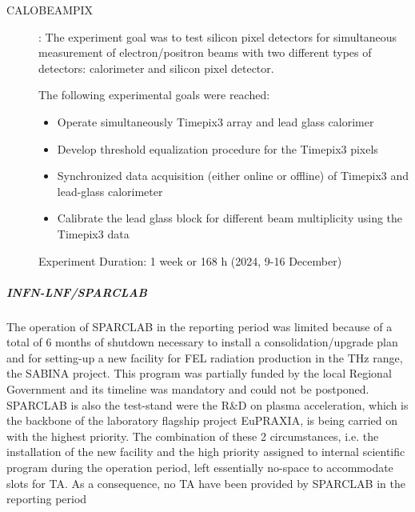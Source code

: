 \begin{description}
\item[CALOBEAMPIX]:
The experiment goal was to test silicon pixel detectors for simultaneous measurement of electron/positron beams with two different types of detectors: calorimeter and silicon pixel detector. 

The following experimental goals were reached:
\begin{itemize}
    \item Operate simultaneously Timepix3 array and lead glass calorimer
    \item Develop threshold equalization procedure for the Timepix3 pixels
    \item Synchronized data acquisition (either online or offline) of Timepix3 and lead-glass calorimeter
    \item Calibrate the lead glass block for different beam multiplicity using the Timepix3 data
\end{itemize}
Experiment Duration: 1 week or 168 h (2024, 9-16 December)
\end{description}

\subparagraph{INFN-LNF/SPARCLAB}

The operation of SPARCLAB in the reporting period was limited because of a total of 6 months of shutdown necessary to install a consolidation/upgrade plan and for setting-up a new facility for FEL radiation production in the THz range, the SABINA project. This program was partially funded by the local Regional Government and its timeline was mandatory and could not be postponed. SPARCLAB is also the test-stand were the R\&D on plasma acceleration, which is the backbone of the laboratory flagship project EuPRAXIA, is being carried on with the highest priority. The combination of these 2 circumstances, i.e. the installation of the new facility and the high priority assigned to internal scientific program during the operation period, left essentially no-space to accommodate slots for TA. As a consequence, no TA have been provided by SPARCLAB in the reporting period


